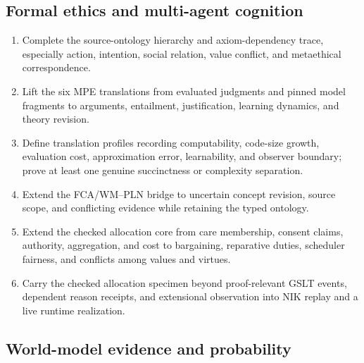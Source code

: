 \documentclass[11pt]{article}
\theoremstyle{definition}
\theoremstyle{remark}
\begin{document}
\subsection{Formal ethics and multi-agent cognition}

\begin{enumerate}
\item Complete the source-ontology hierarchy and axiom-dependency trace,
  especially action, intention, social relation, value conflict, and
  metaethical correspondence.
\item Lift the six MPE translations from evaluated judgments and pinned model
  fragments to arguments, entailment, justification, learning dynamics, and
  theory revision.
\item Define translation profiles recording computability, code-size growth,
  evaluation cost, approximation error, learnability, and observer boundary;
  prove at least one genuine succinctness or complexity separation.
\item Extend the FCA/WM--PLN bridge to uncertain concept revision, source scope,
  and conflicting evidence while retaining the typed ontology.
\item Extend the checked allocation core from care membership, consent claims,
  authority, aggregation, and cost to bargaining, reparative duties, scheduler
  fairness, and conflicts among values and virtues.
\item Carry the checked allocation specimen beyond proof-relevant GSLT events,
  dependent reason receipts, and extensional observation into NIK replay and a
  live runtime realization.
\end{enumerate}

\subsection{World-model evidence and probability}
\end{document}
